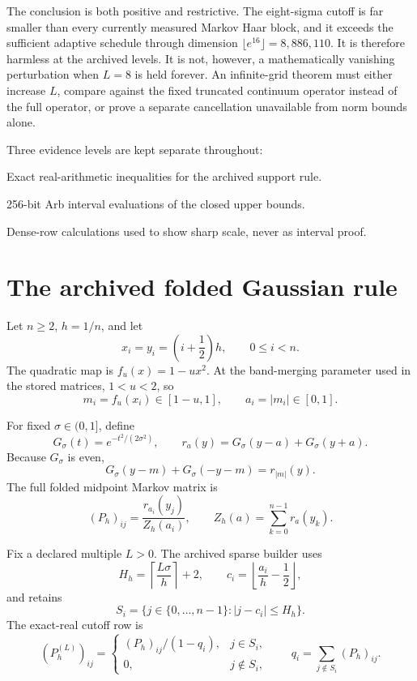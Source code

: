 \documentclass[11pt]{article}
\theoremstyle{definition}
\theoremstyle{remark}
\begin{document}
The conclusion is both positive and restrictive.  The eight-sigma cutoff is
far smaller than every currently measured Markov Haar block, and it exceeds
the sufficient adaptive schedule through dimension
$\lfloor e^{16}\rfloor=8{,}886{,}110$.  It is therefore harmless at the
archived levels.  It is not, however, a mathematically vanishing perturbation
when $L=8$ is held forever.  An infinite-grid theorem must either increase
$L$, compare against the fixed truncated continuum operator instead of the
full operator, or prove a separate cancellation unavailable from norm bounds
alone.

Three evidence levels are kept separate throughout:

\begin{description}[leftmargin=2.8cm,style=nextline]
 \item[Analytic theorem]
 Exact real-arithmetic inequalities for the archived support rule.
 \item[Validated constants]
 256-bit Arb interval evaluations of the closed upper bounds.
 \item[Floating diagnostic]
 Dense-row calculations used to show sharp scale, never as interval proof.
\end{description}

\section{The archived folded Gaussian rule}
\label{sec:model}

Let $n\ge2$, $h=1/n$, and let
\[
x_i=y_i=\left(i+\frac12\right)h,
\qquad 0\le i<n.
\]
The quadratic map is $f_u(x)=1-ux^2$.  At the band-merging parameter used in
the stored matrices, $1<u<2$, so
\[
m_i=f_u(x_i)\in[1-u,1],
\qquad a_i=|m_i|\in[0,1].
\]

For fixed $\sigma\in(0,1]$, define
\[
G_\sigma(t)=e^{-t^2/(2\sigma^2)},
\qquad
r_a(y)=G_\sigma(y-a)+G_\sigma(y+a).
\]
Because $G_\sigma$ is even,
\[
G_\sigma(y-m)+G_\sigma(-y-m)=r_{|m|}(y).
\]
The full folded midpoint Markov matrix is
\begin{equation}
(P_h)_{ij}
=\frac{r_{a_i}(y_j)}{Z_h(a_i)},
\qquad
Z_h(a)=\sum_{k=0}^{n-1}r_a(y_k).
\label{eq:full-matrix}
\end{equation}

Fix a declared multiple $L>0$.  The archived sparse builder uses
\begin{equation}
H_h=\left\lceil\frac{L\sigma}{h}\right\rceil+2,
\qquad
c_i=\left\lfloor\frac{a_i}{h}-\frac12\right\rfloor,
\label{eq:archived-support}
\end{equation}
and retains
\[
S_i=\{j\in\{0,\ldots,n-1\}:|j-c_i|\le H_h\}.
\]
The exact-real cutoff row is
\begin{equation}
(P_h^{(L)})_{ij}=
\begin{cases}
(P_h)_{ij}/(1-q_i),&j\in S_i,\\
0,&j\notin S_i,
\end{cases}
\qquad
q_i=\sum_{j\notin S_i}(P_h)_{ij}.
\label{eq:cutoff-matrix}
\end{equation}
\end{document}

